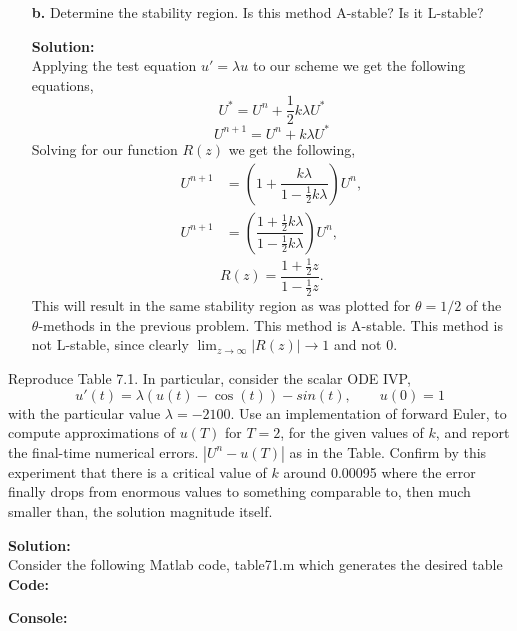\documentclass[12pt]{article}
\makeatletter
\theoremstyle{homework}
\newenvironment{exercise}[1]
{\def\@currentlabel{#1}\exercisecore}
{\endexercisecore}
\newcommand{\localhead}[1]{\par\smallskip\noindent\textbf{#1}\nobreak\\}%
\newcommand\solution{\localhead{Solution:}}
\makeatother
\begin{document}
\begin{exercise}{Problem P31}
\begin{enumerate}
    \item[\textbf{b.}] Determine the stability region. Is this method A-stable? Is it L-stable?
    \solution  Applying the test equation $u' = \lambda u$ to our scheme we get the following equations, 
    \begin{equation*}
      U^* = U^n + \frac{1}{2}k\lambda U^*
    \end{equation*}
    \begin{equation*}
      U^{n + 1} = U^n + k\lambda U^*
    \end{equation*}
    Solving for our function $R(z)$ we get the following, 
    \begin{align*}
      U^{n + 1} &= \left(1 + \dfrac{k\lambda}{1 - \frac{1}{2}k\lambda}\right)U^n,\\
      U^{n + 1} &= \left(\dfrac{1 + \frac{1}{2}k\lambda}{1 - \frac{1}{2}k\lambda}\right)U^n,
    \end{align*}
    \begin{equation*}
      R(z) = \dfrac{1 + \frac{1}{2}z}{1 - \frac{1}{2}z}.
    \end{equation*}
    This will result in the same stability region as was plotted for $\theta = 1/2$ of the $\theta$-methods in the previous problem. 
    This method is A-stable. This method is not L-stable, since clearly $\lim_{z \to \infty} |R(z)| \to 1$ and not $0$. 
  \end{enumerate}
\end{exercise}
\vspace{.15in}




\begin{exercise}{Problem P32} Reproduce Table 7.1. In particular, consider the scalar ODE IVP, 
  \begin{equation*}
    u'(t) = \lambda(u(t) - \cos(t))- sin(t), \qquad u(0) = 1
  \end{equation*}
  with the particular value $\lambda = -2100$. Use an implementation of forward Euler, to compute 
  approximations of $u(T)$ for $T = 2$, for the given values of $k$, and report the final-time numerical errors. 
  $|U^n - u(T)|$ as in the Table. Confirm by this experiment that there is a critical value of $k$ around 0.00095 
  where the error finally drops from enormous values to something comparable to, then much smaller than, the solution magnitude itself. 
  \solution Consider the following Matlab code, table71.m which generates the desired table\\

  \textbf{Code:}
  \begin{center}
    
  \end{center}
  
  \textbf{Console:}
  \begin{center}
    
  \end{center}

\end{exercise}
\vspace{.15in}
\end{document}
